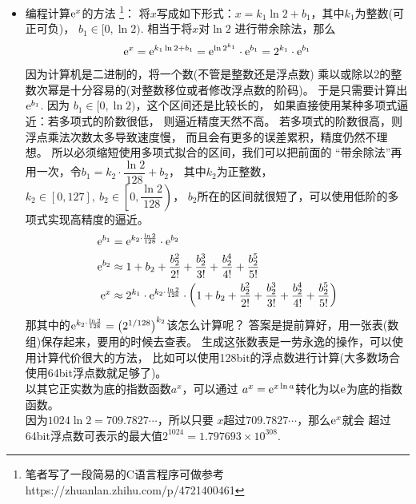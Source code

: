 \begin{itemize}[leftmargin=\inteval{\myitemleftmargin}pt,itemsep=
   \inteval{\myitemitempsep}pt,topsep=\inteval{\myitemtopsep}pt]
\item 编程计算$ \mathrm{e}^x $的方法
\footnote{笔者写了一段简易的C语言程序可做参考
    https://zhuanlan.zhihu.com/p/4721400461}：
将$ x $写成如下形式：$ x=k_1\ln2 +b_1 $，其中$ k_1 $为整数(可正可负)，
$ b_1\in[0,\ln2) $. 相当于将$ x $对$ \ln2 $
进行带余除法，那么
\begin{align*}
    \mathrm{e}^x=\mathrm{e}^{k_1\ln2 +b_1}=\mathrm{e}^{\ln2^{k_1}}\cdot \mathrm{e}^{b_1}=
    2^{k_1}\cdot \mathrm{e}^{b_1}
\end{align*}
因为计算机是二进制的，将一个数(不管是整数还是浮点数)
乘以或除以2的整数次幂是十分容易的(对整数移位或者修改浮点数的阶码)。
于是只需要计算出$ \mathrm{e}^{b_1} $. 因为
$ b_1\in[0,\ln2) $，这个区间还是比较长的，
如果直接使用某种多项式逼近：若多项式的阶数很低，
则逼近精度天然不高。
若多项式的阶数很高，则浮点乘法次数太多导致速度慢，
而且会有更多的误差累积，精度仍然不理想。
所以必须缩短使用多项式拟合的区间，我们可以把前面的
“带余除法”再用一次，令$ b_1=k_2\cdot \dfrac{\ln2}{128}+b_2 $，
其中$ k_2 $为正整数，$ k_2\in[0,127],\ 
b_2\in\left[0,\dfrac{\ln2}{128}\right)$，
$ b_2 $所在的区间就很短了，可以使用低阶的多项式实现高精度的逼近。
\begin{align*}
    \mathrm{e}^{b_1}&=\mathrm{e}^{k_2\cdot\frac{\ln2}{128}}\cdot \mathrm{e}^{b_2} \\
    \mathrm{e}^{b_2}&\approx 1+b_2+\frac{b_2^2}{2!}+\frac{b_2^3}{3!}
    +\frac{b_2^4}{4!}+\frac{b_2^5}{5!} \\
    \mathrm{e}^x&\approx 2^{k_1}\cdot \mathrm{e}^{k_2\cdot\frac{\ln2}{128}}
    \cdot\left(1+b_2+\frac{b_2^2}{2!}+\frac{b_2^3}{3!}
    +\frac{b_2^4}{4!}+\frac{b_2^5}{5!} \right)
\end{align*}
那其中的$ \mathrm{e}^{k_2\cdot\frac{\ln2}{128}}=
\left(2^{1/128}\right)^{k_2} $该怎么计算呢？
答案是提前算好，用一张表(数组)保存起来，要用的时候去查表。
生成这张数表是一劳永逸的操作，可以使用计算代价很大的方法，
比如可以使用128bit的浮点数进行计算(大多数场合
使用64bit浮点数就足够了)。\\
以其它正实数为底的指数函数$ a^x $，可以通过
$ a^x=\mathrm{e}^{x\ln a} $转化为以$ \mathrm{e} $为底的指数函数。\\
因为$ 1024\ln 2=709.7827\cdots $，所以只要
$ x $超过$ 709.7827\cdots $，那么$ \mathrm{e}^x $就会
超过64bit浮点数可表示的最大值$ 2^{1024}=1.797693\times10^{308} $.


\end{itemize}
